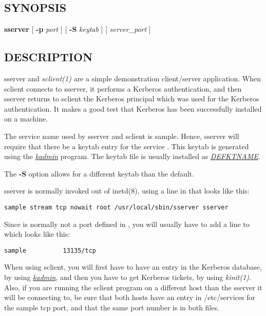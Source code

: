 \documentclass[letterpaper,10pt,english]{sphinxmanual}
\begin{document}
\subsection{SYNOPSIS}
\label{admin/admin_commands/sserver:synopsis}
\textbf{sserver}
{[} \textbf{-p} \emph{port} {]}
{[} \textbf{-S} \emph{keytab} {]}
{[} \emph{server\_port} {]}


\subsection{DESCRIPTION}
\label{admin/admin_commands/sserver:description}
sserver and \emph{sclient(1)} are a simple demonstration client/server
application.  When sclient connects to sserver, it performs a Kerberos
authentication, and then sserver returns to sclient the Kerberos
principal which was used for the Kerberos authentication.  It makes a
good test that Kerberos has been successfully installed on a machine.

The service name used by sserver and sclient is sample.  Hence,
sserver will require that there be a keytab entry for the service
.  This keytab is generated
using the {\hyperref[admin/admin_commands/kadmin_local:kadmin-1]{\emph{kadmin}}} program.  The keytab file is usually
installed as {\hyperref[mitK5defaults:paths]{\emph{DEFKTNAME}}}.

The \textbf{-S} option allows for a different keytab than the default.

sserver is normally invoked out of inetd(8), using a line in
 that looks like this:

\begin{Verbatim}[commandchars=\\\{\}]
sample stream tcp nowait root /usr/local/sbin/sserver sserver
\end{Verbatim}

Since  is normally not a port defined in ,
you will usually have to add a line to  which looks
like this:

\begin{Verbatim}[commandchars=\\\{\}]
sample          13135/tcp
\end{Verbatim}

When using sclient, you will first have to have an entry in the
Kerberos database, by using {\hyperref[admin/admin_commands/kadmin_local:kadmin-1]{\emph{kadmin}}}, and then you have to get
Kerberos tickets, by using \emph{kinit(1)}.  Also, if you are running
the sclient program on a different host than the sserver it will be
connecting to, be sure that both hosts have an entry in /etc/services
for the sample tcp port, and that the same port number is in both
files.
\end{document}
